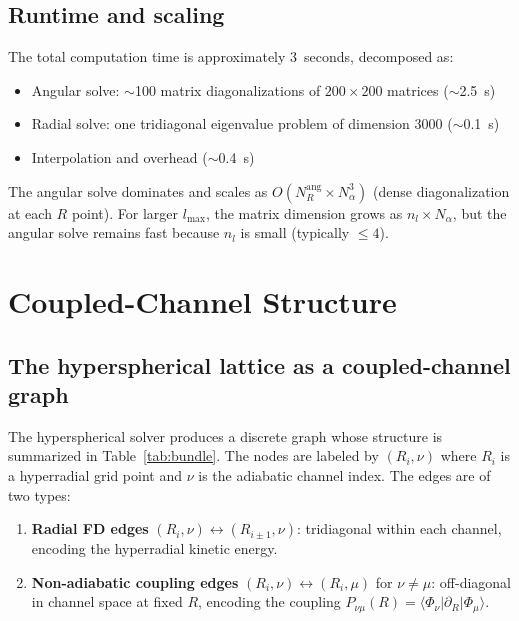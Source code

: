 \documentclass[aps,pra,twocolumn,superscriptaddress,longbibliography]{revtex4-2}
\begin{document}
\subsection{Runtime and scaling}

The total computation time is approximately 3~seconds, decomposed as:
\begin{itemize}
  \item Angular solve: $\sim$100 matrix diagonalizations of
    $200\times 200$ matrices ($\sim$2.5~s)
  \item Radial solve: one tridiagonal eigenvalue problem of
    dimension 3000 ($\sim$0.1~s)
  \item Interpolation and overhead ($\sim$0.4~s)
\end{itemize}

The angular solve dominates and scales as $O(N_R^{\mathrm{ang}}
\times N_\alpha^3)$ (dense diagonalization at each $R$ point).  For
larger $l_{\max}$, the matrix dimension grows as $n_l \times
N_\alpha$, but the angular solve remains fast because $n_l$ is small
(typically $\leq 4$).


\section{Coupled-Channel Structure}
\label{sec:fiber_bundle}

\subsection{The hyperspherical lattice as a coupled-channel graph}

The hyperspherical solver produces a discrete graph whose structure
is summarized in Table~\ref{tab:bundle}.  The nodes are labeled by
$(R_i, \nu)$ where $R_i$ is a hyperradial grid point and $\nu$ is the
adiabatic channel index.  The edges are of two types:
\begin{enumerate}
  \item \textbf{Radial FD edges} $(R_i, \nu) \leftrightarrow
    (R_{i\pm 1}, \nu)$: tridiagonal within each channel,
    encoding the hyperradial kinetic energy.
  \item \textbf{Non-adiabatic coupling edges}
    $(R_i, \nu) \leftrightarrow (R_i, \mu)$ for $\nu \neq \mu$:
    off-diagonal in channel space at fixed $R$, encoding the
    coupling $P_{\nu\mu}(R) = \langle\Phi_\nu|\partial_R|\Phi_\mu
    \rangle$.
\end{enumerate}
\end{document}
